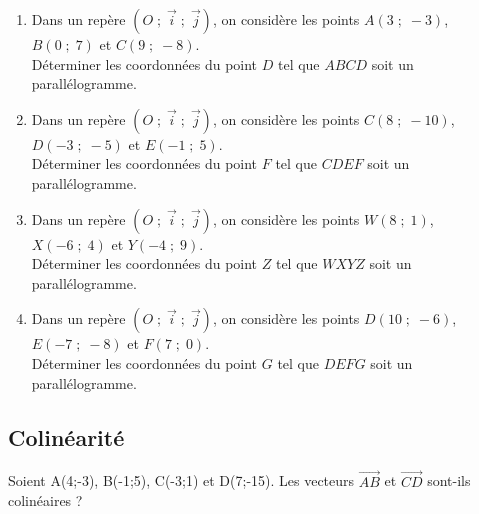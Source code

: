 {%
\begin{Exercice}%
\leavevmode\vspace{-\baselineskip}
\begin{enumerate}[itemsep=1em]
	\item \begin{minipage}[t]{\linewidth}Dans un repère $(O\;;\;\overrightarrow{i}\;;\;\overrightarrow{j})$, on considère les points $A(3\;;\;-3)$, $B(0\;;\;7)$ et $C(9\;;\;-8)$.\\Déterminer les coordonnées du point $D$ tel que $ABCD$ soit un parallélogramme.\end{minipage}
	\item \begin{minipage}[t]{\linewidth}Dans un repère $(O\;;\;\overrightarrow{i}\;;\;\overrightarrow{j})$, on considère les points $C(8\;;\;-10)$, $D(-3\;;\;-5)$ et $E(-1\;;\;5)$.\\Déterminer les coordonnées du point $F$ tel que $CDEF$ soit un parallélogramme.\end{minipage}
	\item \begin{minipage}[t]{\linewidth}Dans un repère $(O\;;\;\overrightarrow{i}\;;\;\overrightarrow{j})$, on considère les points $W(8\;;\;1)$, $X(-6\;;\;4)$ et $Y(-4\;;\;9)$.\\Déterminer les coordonnées du point $Z$ tel que $WXYZ$ soit un parallélogramme.\end{minipage}
	\item \begin{minipage}[t]{\linewidth}Dans un repère $(O\;;\;\overrightarrow{i}\;;\;\overrightarrow{j})$, on considère les points $D(10\;;\;-6)$, $E(-7\;;\;-8)$ et $F(7\;;\;0)$.\\Déterminer les coordonnées du point $G$ tel que $DEFG$ soit un parallélogramme.\end{minipage}
\end{enumerate}
\end{Exercice}


\subsection*{Colinéarité}
\begin{Exercice}
Soient A(4;-3), B(-1;5), C(-3;1) et D(7;-15).
Les vecteurs $ \overrightarrow{AB} $ et $ \overrightarrow{CD} $ sont-ils colinéaires ?
\end{Exercice}


}
